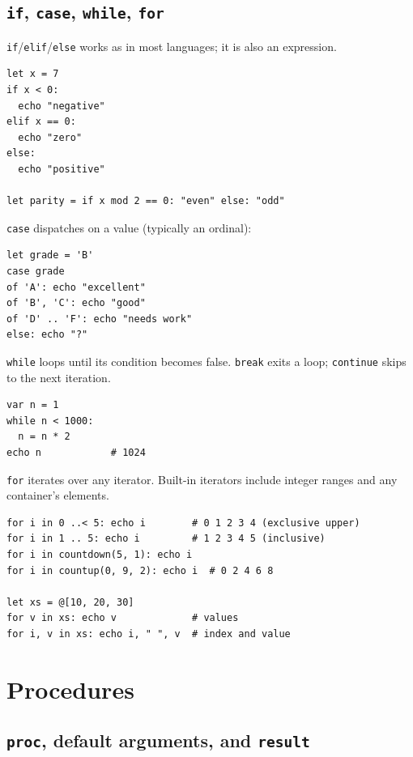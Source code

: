 \documentclass[justified, sixbynine]{tufte-book}
\def\ft{\small\tt}
\theoremstyle{plain}%
\newtheorem * {corollary}{Corollary}
\theoremstyle{definition}
\theoremstyle{remark}
\newtheorem * {remark}{Remark}
\newtheorem * {note}{Note}
\begin{document}
\begin{fullwidth}
\goodbreak\subsection{{\ft if}, {\ft case}, {\ft while}, {\ft for}}


{\ft if}/{\ft elif}/{\ft else} works as in most languages; it is also an expression.

\begin{lstlisting}
let x = 7
if x < 0:
  echo "negative"
elif x == 0:
  echo "zero"
else:
  echo "positive"

let parity = if x mod 2 == 0: "even" else: "odd"
\end{lstlisting}

{\ft case} dispatches on a value (typically an ordinal):

\begin{lstlisting}
let grade = 'B'
case grade
of 'A': echo "excellent"
of 'B', 'C': echo "good"
of 'D' .. 'F': echo "needs work"
else: echo "?"
\end{lstlisting}

{\ft while} loops until its condition becomes false. {\ft break} exits a loop; {\ft continue} skips to the next iteration.

\begin{lstlisting}
var n = 1
while n < 1000:
  n = n * 2
echo n            # 1024
\end{lstlisting}

{\ft for} iterates over any iterator. Built-in iterators include integer ranges and any container's elements.

\begin{lstlisting}
for i in 0 ..< 5: echo i        # 0 1 2 3 4 (exclusive upper)
for i in 1 .. 5: echo i         # 1 2 3 4 5 (inclusive)
for i in countdown(5, 1): echo i
for i in countup(0, 9, 2): echo i  # 0 2 4 6 8

let xs = @[10, 20, 30]
for v in xs: echo v             # values
for i, v in xs: echo i, " ", v  # index and value
\end{lstlisting}

\goodbreak\section{Procedures}

\goodbreak\subsection{{\ft proc}, default arguments, and {\ft result}}


\end{fullwidth}
\end{document}
